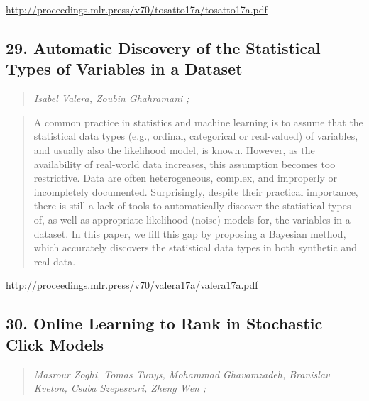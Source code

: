 \documentclass{article}
\begin{document}
\href{http://proceedings.mlr.press/v70/tosatto17a/tosatto17a.pdf}{http://proceedings.mlr.press/v70/tosatto17a/tosatto17a.pdf}

\subsection{29. Automatic Discovery of the Statistical Types of Variables in a Dataset}

\begin{quote}
\footnotesize{\textit{Isabel Valera, Zoubin Ghahramani ;}}

\end{quote}

\begin{quote}
    A common practice in statistics and machine learning is to assume that the statistical data types (e.g., ordinal, categorical or real-valued) of variables, and usually also the likelihood model, is known. However, as the availability of real-world data increases, this assumption becomes too restrictive. Data are often heterogeneous, complex, and improperly or incompletely documented. Surprisingly, despite their practical importance, there is still a lack of tools to automatically discover the statistical types of, as well as appropriate likelihood (noise) models for, the variables in a dataset. In this paper, we fill this gap by proposing a Bayesian method, which accurately discovers the statistical data types in both synthetic and real data.  
\end{quote}

\href{http://proceedings.mlr.press/v70/valera17a/valera17a.pdf}{http://proceedings.mlr.press/v70/valera17a/valera17a.pdf}

\subsection{30. Online Learning to Rank in Stochastic Click Models}

\begin{quote}
\footnotesize{\textit{Masrour Zoghi, Tomas Tunys, Mohammad Ghavamzadeh, Branislav Kveton, Csaba Szepesvari, Zheng Wen ;}}

\end{quote}
\end{document}
